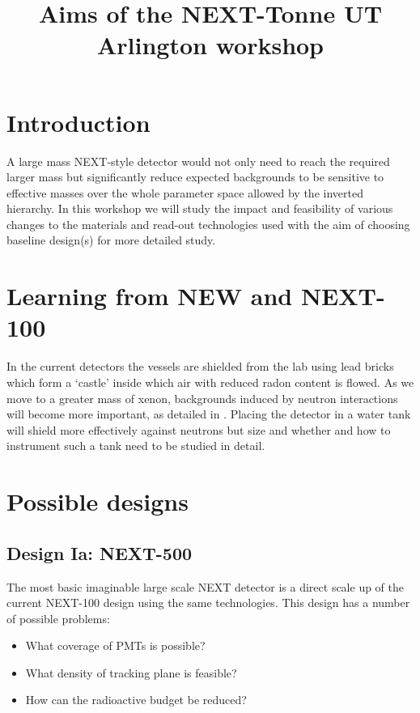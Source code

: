 \documentclass[11pt,a4paper]{article}
\begin{document}
\title{Aims of the NEXT-Tonne UT Arlington workshop}

\maketitle



\section{Introduction}
A large mass NEXT-style detector would not only need to reach the required larger mass but significantly reduce expected backgrounds to be sensitive to effective masses over the whole parameter space allowed by the inverted hierarchy. In this workshop we will study the impact and feasibility of various changes to the materials and read-out technologies used with the aim of choosing baseline design(s) for more detailed study.

\section{Learning from NEW and NEXT-100}
In the current detectors the vessels are shielded from the lab using lead bricks which form a `castle' inside which air with reduced radon content is flowed. As we move to a greater mass of xenon, backgrounds induced by neutron interactions will become more important, as detailed in \cite{munozth:2018}. Placing the detector in a water tank will shield more effectively against neutrons but size and whether and how to instrument such a tank need to be studied in detail.


\section{Possible designs}
\label{sec:posdes}

\subsection{Design Ia: NEXT-500}
\label{subSec:desia}
The most basic imaginable large scale NEXT detector is a direct scale up of the current NEXT-100 design using the same technologies. This design has a number of possible problems:
\begin{itemize}
\item What coverage of PMTs is possible?
\item What density of tracking plane is feasible?
\item How can the radioactive budget be reduced?
\end{itemize}
\end{document}

